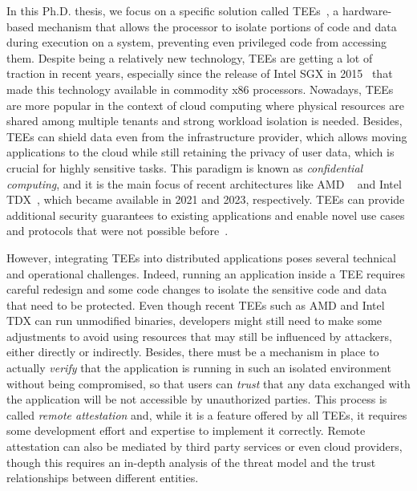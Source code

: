 In this Ph.D. thesis, we focus on a specific solution called
\acp{TEE}~\cite{schneider2022hardware}, a hardware-based mechanism that allows
the processor to isolate portions of code and data during execution on a system,
preventing even privileged code from accessing them. Despite being a relatively
new technology, \acp{TEE} are getting a lot of traction in recent years,
especially since the release of Intel \ac{SGX} in 2015~\cite{sgx} that made this
technology available in commodity x86 processors. Nowadays, \acp{TEE} are more
popular in the context of cloud computing where physical resources are shared
among multiple tenants and strong workload isolation is needed. Besides,
\acp{TEE} can shield data even from the infrastructure provider, which allows
moving applications to the cloud while still retaining the privacy of user data,
which is crucial for highly sensitive tasks. This paradigm is known as
\emph{confidential computing}, and it is the main focus of recent architectures
like AMD \sevsnp{}~\cite{AmdSevSnpWhitepaper} and Intel
\ac{TDX}~\cite{intelTdxWhitepaper}, which became available in 2021 and 2023,
respectively. \acp{TEE} can provide additional security guarantees to existing
applications and enable novel use cases and protocols that were not possible
before~\cite{caseConfidentialComputing}.

However, integrating \acp{TEE} into distributed applications poses several
technical and operational challenges. Indeed, running an application inside a
\ac{TEE} requires careful redesign and some code changes to isolate the
sensitive code and data that need to be protected. Even though recent \acp{TEE}
such as AMD \sevsnp{} and Intel \ac{TDX} can run unmodified binaries, developers
might still need to make some adjustments to avoid using resources that may
still be influenced by attackers, either directly or indirectly. Besides, there
must be a mechanism in place to actually \emph{verify} that the application is
running in such an isolated environment without being compromised, so that users
can \emph{trust} that any data exchanged with the application will be not
accessible by unauthorized parties. This process is called \emph{remote
attestation}
and, while it is a feature offered by all \acp{TEE}, it requires some
development effort and expertise to implement it correctly. Remote attestation
can also be mediated by third party services or even cloud providers, though
this requires an in-depth analysis of the threat model and the trust
relationships between different entities.

